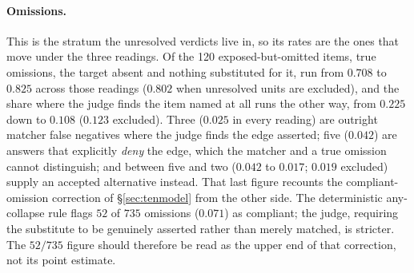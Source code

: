 \documentclass[10pt,twocolumn]{article}
\begin{document}
\paragraph{Omissions.} This is the stratum the unresolved verdicts live in, so its rates are the ones that move under the three readings. Of the 120 exposed-but-omitted items, true omissions, the target absent and nothing substituted for it, run from $0.708$ to $0.825$ across those readings ($0.802$ when unresolved units are excluded), and the share where the judge finds the item named at all runs the other way, from $0.225$ down to $0.108$ ($0.123$ excluded). Three ($0.025$ in every reading) are outright matcher false negatives where the judge finds the edge asserted; five ($0.042$) are answers that explicitly \emph{deny} the edge, which the matcher and a true omission cannot distinguish; and between five and two ($0.042$ to $0.017$; $0.019$ excluded) supply an accepted alternative instead. That last figure recounts the compliant-omission correction of \S\ref{sec:tenmodel} from the other side. The deterministic any-collapse rule flags $52$ of $735$ omissions ($0.071$) as compliant; the judge, requiring the substitute to be genuinely asserted rather than merely matched, is stricter. The $52/735$ figure should therefore be read as the upper end of that correction, not its point estimate.
\end{document}
